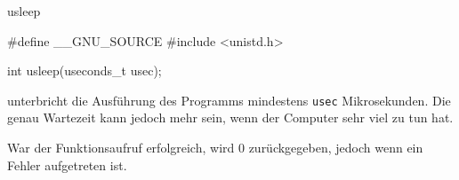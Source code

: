 \begin{man}{usleep}
    \begin{synopsis}
        \begin{plaincode}[gobble=8]
            #define __GNU_SOURCE
            #include <unistd.h>

            int usleep(useconds_t usec);
        \end{plaincode}
    \end{synopsis}

    \begin{desc}
         unterbricht die Ausführung des Programms mindestens \texttt{usec} Mikrosekunden.
        Die genau Wartezeit kann jedoch mehr sein, wenn der Computer sehr viel zu tun hat.
    \end{desc}


    \begin{returns}
        War der Funktionsaufruf erfolgreich, wird 0 zurückgegeben,  jedoch wenn ein Fehler aufgetreten ist.
    \end{returns}

\end{man}

